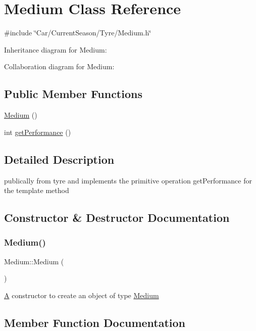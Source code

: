 \hypertarget{classMedium}{}\section{Medium Class Reference}
\label{classMedium}


{\ttfamily \#include \char`\"{}Car/\+Current\+Season/\+Tyre/\+Medium.\+h\char`\"{}}



Inheritance diagram for Medium\+:


Collaboration diagram for Medium\+:
\subsection*{Public Member Functions}
\begin{DoxyCompactItemize}
\item 
\hyperlink{classMedium_a9dfadab5a1a69868f5add5f36d8e72c2}{Medium} ()
\item 
int \hyperlink{classMedium_aad3fd641f9ed28ce18067291e9c51151}{get\+Performance} ()
\end{DoxyCompactItemize}


\subsection{Detailed Description}
publically from tyre and implements the primitive operation get\+Performance for the template method 

\subsection{Constructor \& Destructor Documentation}
\mbox{\label{classMedium_a9dfadab5a1a69868f5add5f36d8e72c2}} 
\subsubsection{\texorpdfstring{Medium()}{Medium()}}
{\footnotesize\ttfamily Medium\+::\+Medium (\begin{DoxyParamCaption}{ }\end{DoxyParamCaption})}

\hyperlink{classA}{A} constructor to create an object of type \hyperlink{classMedium}{Medium} 

\subsection{Member Function Documentation}
\mbox{\label{classMedium_aad3fd641f9ed28ce18067291e9c51151}} 
